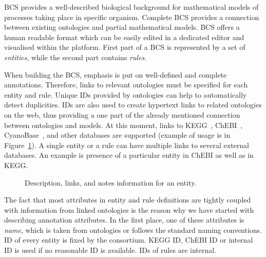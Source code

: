 \documentclass[12pt]{fithesis2}
\begin{document}
BCS provides a well-described biological background for mathematical models of processes taking place in specific organism. Complete BCS provides a connection between existing ontologies and partial mathematical models. BCS offers a human readable format which can be easily edited in a dedicated editor and visualised within the platform. First part of a BCS is represented by a set of \emph{entities}, while the second part contains \emph{rules}.

When building the BCS, emphasis is put on well-defined and complete annotations. Therefore, links to relevant ontologies must be specified for each entity and rule. Unique IDs provided by ontologies can help to automatically detect duplicities. IDs are also used to create hypertext links to related ontologies on the web, thus providing a one part of the already mentioned connection between ontologies and models. At this moment, links to KEGG~\cite{Kanehisa04012016}, ChEBI~\cite{ChEBI}, CyanoBase~\cite{CyanoBase}, and other databases are supported (example of usage is in Figure~\ref{database_links}). A single entity or a rule can have multiple links to several external databases. An example is presence of a particular entity in ChEBI as well as in KEGG.

\begin{figure}[!h]
\begin{center}
\end{center}
\caption{Description, links, and notes information for an entity.}\label{database_links}
\end{figure}

The fact that most attributes in entity and rule definitions are tightly coupled with information from linked ontologies is the reason why we have started with describing annotation attributes. In the first place, one of these attributes is \emph{name}, which is taken from ontologies or follows the standard naming conventions. ID of every entity is fixed by the consortium. KEGG ID, ChEBI ID or internal ID is used if no reasonable ID is available. IDs of rules are internal.
\end{document}
